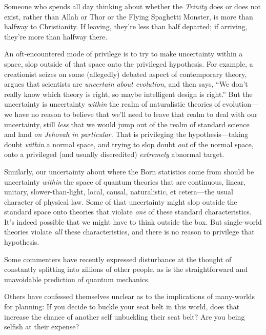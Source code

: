 {
 Someone who spends all day thinking about whether the
\textit{Trinity} does or does not exist, rather than Allah or Thor or
the Flying Spaghetti Monster, is more than halfway to Christianity. If
leaving, they're less than half departed; if arriving,
they're more than halfway there.}

{
 An oft-encountered mode of privilege is to try to make uncertainty
within a space, slop outside of that space onto the privileged
hypothesis. For example, a creationist seizes on some (allegedly)
debated aspect of contemporary theory, argues that scientists are
\textit{uncertain about evolution}, and then says,
``We don't really know which theory is
right, so maybe intelligent design is right.'' But
the uncertainty is uncertainty \textit{within} the realm of
naturalistic theories of evolution---we have no reason to believe that
we'll need to leave that realm to deal with our
uncertainty, still \textit{less} that we would jump out of the realm of
standard science and land \textit{on Jehovah in particular.} That is
privileging the hypothesis---taking doubt \textit{within} a normal
space, and trying to slop doubt \textit{out} of the normal space, onto
a privileged (and usually discredited) \textit{extremely} abnormal
target.}

{
 Similarly, our uncertainty about where the Born statistics come
from should be uncertainty \textit{within} the space of quantum
theories that are continuous, linear, unitary, slower-than-light,
local, causal, naturalistic, et cetera---the usual character of
physical law. Some of that uncertainty might slop outside the standard
space onto theories that violate \textit{one} of these standard
characteristics. It's indeed possible that we might
have to think outside the box. But single-world theories violate
\textit{all} these characteristics, and there is no reason to privilege
that hypothesis.}

\myendsectiontext


{
 Some commenters have recently expressed disturbance at the thought
of constantly splitting into zillions of other people, as is the
straightforward and unavoidable prediction of quantum mechanics. }

{
 Others have confessed themselves unclear as to the implications of
many-worlds for planning: If you decide to buckle your seat belt in
this world, does that increase the chance of another self unbuckling
their seat belt? Are you being selfish at their expense?}

